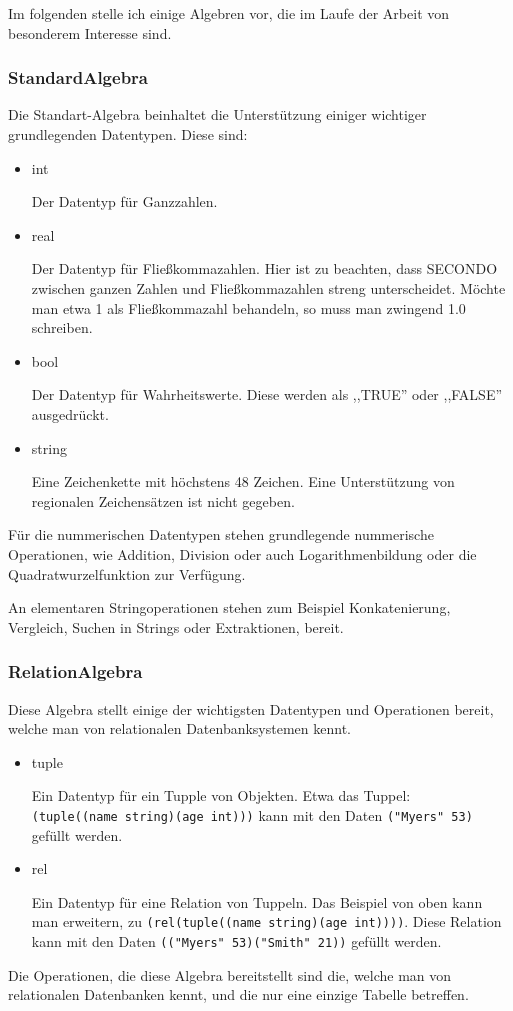 Im folgenden stelle ich einige Algebren vor, die im Laufe der Arbeit von besonderem Interesse sind. 

\subsubsection{StandardAlgebra}
Die Standart-Algebra beinhaltet die Unterstützung einiger wichtiger grundlegenden Datentypen. Diese sind:
\begin{itemize}
\item int

Der Datentyp für Ganzzahlen.
\item real

Der Datentyp für Fließkommazahlen. Hier ist zu beachten, dass SECONDO zwischen ganzen Zahlen und Fließkommazahlen streng unterscheidet. Möchte man etwa 1 als Fließkommazahl behandeln, so muss man zwingend 1.0 schreiben.
\item bool

Der Datentyp für Wahrheitswerte. Diese werden als ,,TRUE'' oder ,,FALSE'' ausgedrückt.
\item string

Eine Zeichenkette mit höchstens 48 Zeichen. Eine Unterstützung von regionalen Zeichensätzen ist nicht gegeben.
\end{itemize}

Für die nummerischen Datentypen stehen grundlegende nummerische Operationen, wie Addition, Division oder auch Logarithmenbildung oder die Quadratwurzelfunktion zur Verfügung.

An elementaren Stringoperationen stehen zum Beispiel Konkatenierung, Vergleich, Suchen in Strings oder Extraktionen, bereit.

\subsubsection{RelationAlgebra}

Diese Algebra stellt einige der wichtigsten Datentypen und Operationen bereit, welche man von relationalen Datenbanksystemen kennt.
 
\begin{itemize}
\item tuple

Ein Datentyp für ein Tupple von Objekten. Etwa das Tuppel:\\ \verb+(tuple((name string)(age int)))+ kann mit den Daten \verb+("Myers" 53)+ gefüllt werden.
\item rel

Ein Datentyp für eine Relation von Tuppeln. Das Beispiel von oben kann man erweitern, zu \verb+(rel(tuple((name string)(age int))))+. Diese Relation kann mit den Daten \verb+(("Myers" 53)("Smith" 21))+ gefüllt werden.
\end{itemize}
Die Operationen, die diese Algebra bereitstellt sind die, welche man von relationalen Datenbanken kennt, und die nur eine einzige Tabelle betreffen.

